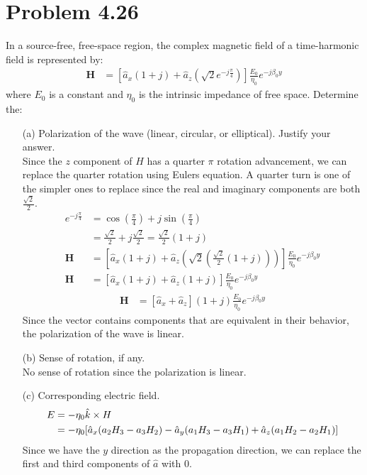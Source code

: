 \documentclass[12pt]{article}
\begin{document}
\section*{Problem 4.26}
In a source-free, free-space region, the complex magnetic field of a time-harmonic field is represented by:
\begin{align*}
  \bm{H} &= \left[ \hat{a}_x(1+j) + \hat{a}_z\left(\sqrt{2}e^{-j \frac{\pi}{4}}\right)   \right]\frac{E_0}{\eta_0}e^{-j \beta_0y}
\end{align*}
where $E_0$ is a constant and $\eta_0$ is the intrinsic impedance of free space. Determine the:
\begin{itemize}
\item[(a)] Polarization of the wave (linear, circular, or elliptical). Justify your answer.\\
  Since the $z$ component of $H$ has a quarter $\pi$ rotation advancement, we can replace the quarter rotation using Eulers equation. A quarter turn is one of the simpler ones to replace since the real and imaginary components are both $\frac{\sqrt{2}}{2}$.
  \begin{align*}
    e^{-j \frac{\pi}{4}} &= \cos{\left(\frac{\pi}{4}\right)} + j\sin{\left(\frac{\pi}{4}\right)}\\
                         &= \frac{\sqrt{2}}{2} + j\frac{\sqrt{2}}{2} = \frac{\sqrt{2}}{2}(1+j)\\
    \bm{H} &= \left[ \hat{a}_x(1+j) + \hat{a}_z\left(\sqrt{2}\left(\frac{\sqrt{2}}{2}(1+j)\right)\right)   \right]\frac{E_0}{\eta_0}e^{-j \beta_0y}\\
    \bm{H} &= \left[ \hat{a}_x(1+j) + \hat{a}_z(1+j)   \right]\frac{E_0}{\eta_0}e^{-j \beta_0y}
  \end{align*}
  \begin{align*}
    \bm{H} &= \left[ \hat{a}_x + \hat{a}_z\right](1+j)\frac{E_0}{\eta_0}e^{-j \beta_0y}
  \end{align*}
  Since the vector contains components that are equivalent in their behavior, the polarization of the wave is linear.
\item[(b)] Sense of rotation, if any.\\
  No sense of rotation since the polarization is linear.
\item[(c)] Corresponding electric field.
  \begin{align*}
    E &= -\eta_0 \hat k \times H\\
      &= -\eta_0[\hat a_x(a_2H_3 -a_3H_2) -\hat a_y(a_1H_3-a_3H_1) + \hat a_z(a_1H_2-a_2H_1)]
  \end{align*}
  Since we have the $y$ direction as the propagation direction, we can replace the first and third components of $\hat a$ with $0$.

\end{itemize}
\end{document}
